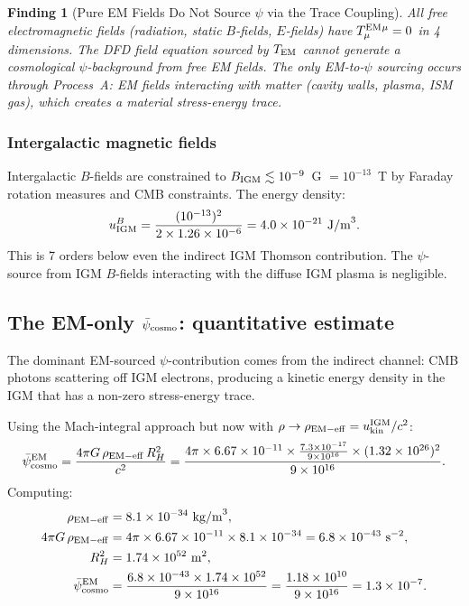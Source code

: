 \documentclass[11pt]{article}
\newtheorem{finding}{Finding}
\newcommand{\ee}[1]{\times 10^{#1}}
\newcommand{\psicosmo}{\bar{\psi}_{\rm cosmo}}
\begin{document}
\begin{finding}[Pure EM Fields Do Not Source $\psi$ via the Trace Coupling]
\label{find:EM-traceless}
All free electromagnetic fields (radiation, static $B$-fields, $E$-fields)
have $T^{\rm EM}_{\mu}{}^{\mu} = 0$ in 4 dimensions. The DFD field equation
sourced by $T_{\rm EM}$ cannot generate a cosmological $\psi$-background
from free EM fields. The only EM-to-$\psi$ sourcing occurs through
Process~A: EM fields interacting with \emph{matter} (cavity walls,
plasma, ISM gas), which creates a material stress-energy trace.
\end{finding}

\subsubsection{Intergalactic magnetic fields}

Intergalactic $B$-fields are constrained to $B_{\rm IGM} \lesssim 10^{-9}$~G
$= 10^{-13}$~T by Faraday rotation measures and CMB constraints. The
energy density:
\begin{equation}
u_{\rm IGM}^B = \frac{(10^{-13})^2}{2\times1.26\ee{-6}}
= 4.0\ee{-21}~\text{J/m}^3.
\label{eq:u-IGM-B}
\end{equation}
This is 7 orders below even the indirect IGM Thomson contribution.
The $\psi$-source from IGM $B$-fields interacting with the diffuse
IGM plasma is negligible.

\subsection{The EM-only $\psicosmo$: quantitative estimate}

The dominant EM-sourced $\psi$-contribution comes from the indirect
channel: CMB photons scattering off IGM electrons, producing a kinetic
energy density in the IGM that has a non-zero stress-energy trace.

Using the Mach-integral approach but now with $\rho \to \rho_{\rm EM-eff}
= u_{\rm kin}^{\rm IGM}/c^2$:
\begin{equation}
\psicosmo^{\rm EM} = \frac{4\pi G\,\rho_{\rm EM-eff}\,R_H^2}{c^2}
= \frac{4\pi\times6.67\ee{-11}\times\frac{7.3\ee{-17}}{9\ee{16}}
\times(1.32\ee{26})^2}{9\ee{16}}.
\label{eq:psi-EM-calc}
\end{equation}
Computing:
\begin{align}
\rho_{\rm EM-eff} &= 8.1\ee{-34}~\text{kg/m}^3, \\
4\pi G\,\rho_{\rm EM-eff} &= 4\pi\times6.67\ee{-11}\times8.1\ee{-34}
= 6.8\ee{-43}~\text{s}^{-2}, \\
R_H^2 &= 1.74\ee{52}~\text{m}^2, \\
\psicosmo^{\rm EM} &= \frac{6.8\ee{-43}\times1.74\ee{52}}{9\ee{16}}
= \frac{1.18\ee{10}}{9\ee{16}}
= 1.3\ee{-7}.
\label{eq:psi-EM-value}
\end{align}
\end{document}
